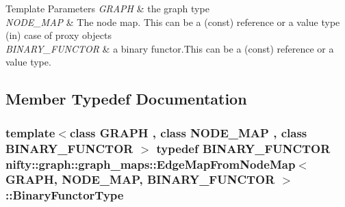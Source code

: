 \begin{DoxyTemplParams}{Template Parameters}
{\em G\+R\+A\+P\+H} & the graph type \\
\hline
{\em N\+O\+D\+E\+\_\+\+M\+A\+P} & The node map. This can be a (const) reference or a value type (in) case of proxy objects \\
\hline
{\em B\+I\+N\+A\+R\+Y\+\_\+\+F\+U\+N\+C\+T\+O\+R} & a binary functor.\+This can be a (const) reference or a value type. \\
\hline
\end{DoxyTemplParams}


\subsection{Member Typedef Documentation}
\hypertarget{classnifty_1_1graph_1_1graph__maps_1_1EdgeMapFromNodeMap_a0fbb6e9a54ecf31d27e13db4f274a6d1}{}
\subsubsection[{Binary\+Functor\+Type}]{\setlength{\rightskip}{0pt plus 5cm}template$<$class G\+R\+A\+P\+H , class N\+O\+D\+E\+\_\+\+M\+A\+P , class B\+I\+N\+A\+R\+Y\+\_\+\+F\+U\+N\+C\+T\+O\+R $>$ typedef B\+I\+N\+A\+R\+Y\+\_\+\+F\+U\+N\+C\+T\+O\+R {\bf nifty\+::graph\+::graph\+\_\+maps\+::\+Edge\+Map\+From\+Node\+Map}$<$ G\+R\+A\+P\+H, N\+O\+D\+E\+\_\+\+M\+A\+P, B\+I\+N\+A\+R\+Y\+\_\+\+F\+U\+N\+C\+T\+O\+R $>$\+::{\bf Binary\+Functor\+Type}}\label{classnifty_1_1graph_1_1graph__maps_1_1EdgeMapFromNodeMap_a0fbb6e9a54ecf31d27e13db4f274a6d1}
\hypertarget{classnifty_1_1graph_1_1graph__maps_1_1EdgeMapFromNodeMap_a551dfc3ef2c5293f5306420d129da574}{}
